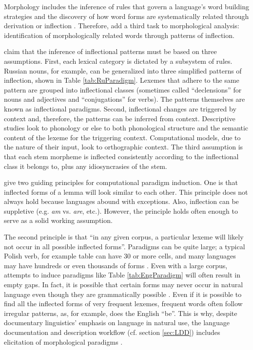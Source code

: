 Morphology includes the inference of rules that govern a language’s word building strategies and the discovery of how word forms are systematically related through derivation or inflection \citep{roark_computational_2007}. Therefore, \cite{virpioja_empirical_2011} add a third task to morphological analysis: identification of morphologically related words through patterns of inflection.

\cite{durrett_supervised_2013} claim that the inference of inflectional patterns must be based on three assumptions. First, each lexical category is dictated by a subsystem of rules. Russian nouns, for example, can be generalized into three simplified patterns of inflection, shown in Table \ref{tab:RuParadigm}. Lexemes that adhere to the same pattern are grouped into inflectional classes (sometimes called ``declensions'' for nouns and adjectives and ``conjugations'' for verbs). The patterns themselves are known as inflectional paradigms. Second, inflectional changes are triggered by context and, therefore, the patterns can be inferred from context. Descriptive studies look to phonology or else to both phonological structure and the semantic content of the lexeme for the triggering context. Computational models, due to the nature of their input, look to orthographic context. The third assumption is that each stem morpheme is inflected consistently according to the inflectional class it belongs to, plus any idiosyncrasies of the stem.

\cite{monson_paramorfinding_2007b} give two guiding principles for computational paradigm induction. One is that inflected forms of a lemma will look similar to each other. This principle does not always hold because languages abound with exceptions. Also, inflection can be suppletive (e.g. \textit{am} vs. \textit{are}, etc.). However, the principle holds often enough to serve as a solid working assumption.  

The second principle is that ``in any given corpus, a particular lexeme will likely not occur in all possible inflected forms''.  
Paradigms can be quite large; a typical Polish verb, for example table can have 30 or more cells, and many languages may have hundreds or even thousands of forms \citep{corbett_unique_2013}. Even with a large corpus, attempts to induce paradigms like Table \ref{tab:EngParadigm} will often result in empty gaps. In fact, it is possible that certain forms may never occur in natural language even though they are grammatically possible \citep{silfverberg_encoder-decoder_2018}. Even if it is possible to find all the inflected forms of very frequent lexemes, frequent words often follow irregular patterns, as, for example, does the English ``be''. This is why, despite documentary linguistics' emphasis on language in natural use, the language documentation and description workflow (cf. section \ref{sec:LDD}) includes elicitation of morphological paradigms \citep{lupke_data_2010,boerger_language_2016}. 


